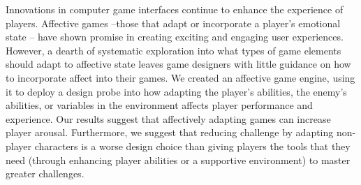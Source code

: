 
Innovations in computer game interfaces continue to enhance the experience of players. Affective games –those that adapt or incorporate a player’s emotional state – have shown promise in creating exciting and engaging user experiences. However, a dearth of systematic exploration into what types of game elements should adapt to affective state leaves game designers with little guidance on how to incorporate affect into their games. We created an affective game engine, using it to deploy a design probe into how adapting the player’s abilities, the enemy’s abilities, or variables in the environment affects player performance and experience. Our results suggest that affectively adapting games can increase player arousal. Furthermore, we suggest that reducing challenge by adapting non-player characters is a worse design choice than giving players the tools that they need (through enhancing player abilities or a supportive environment) to master greater challenges.